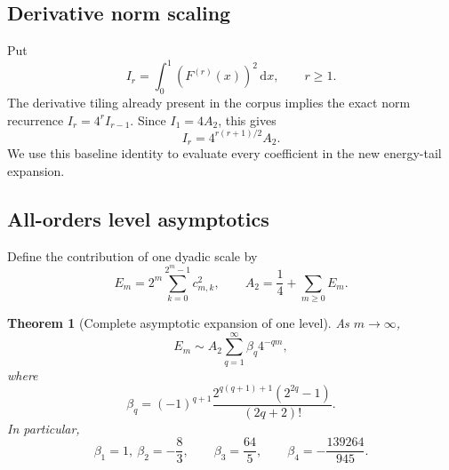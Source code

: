 \documentclass[11pt,oneside]{article}
\newtheorem{theorem}{Theorem}[section]
\theoremstyle{definition}
\theoremstyle{remark}
\newcommand{\dd}{\,\mathrm d}
\newcommand{\1}{\mathbf 1}
\begin{document}
\subsection{Derivative norm scaling}

Put
\begin{equation}
 I_r=\int_0^1\left(F^{(r)}(x)\right)^2\dd x,
 \qquad r\ge1.                                           \label{eq:Ir-definition}
\end{equation}
The derivative tiling already present in the corpus implies the exact norm
recurrence $I_r=4^rI_{r-1}$.  Since $I_1=4A_2$, this gives
\begin{equation}
 \boxed{\displaystyle
 I_r=4^{r(r+1)/2}A_2.}                                   \label{eq:derivative-norm-scaling}
\end{equation}
We use this baseline identity to evaluate every coefficient in the new
energy-tail expansion.

\subsection{All-orders level asymptotics}

Define the contribution of one dyadic scale by
\begin{equation}
 E_m=2^m\sum_{k=0}^{2^m-1}c_{m,k}^2,
 \qquad A_2=\frac14+\sum_{m\ge0}E_m.                     \label{eq:Em-definition}
\end{equation}

\begin{theorem}[Complete asymptotic expansion of one level]
\label{thm:Em-asymptotic}
As $m\to\infty$,
\begin{equation}
 \boxed{\displaystyle
 E_m\sim A_2\sum_{q=1}^\infty\beta_q4^{-qm},}            \label{eq:Em-asymptotic}
\end{equation}
where
\begin{equation}
 \boxed{\displaystyle
 \beta_q=(-1)^{q+1}
 \frac{2^{q(q+1)+1}(2^{2q}-1)}{(2q+2)!}.}                \label{eq:beta-formula}
\end{equation}
In particular,
\begin{equation}
 \beta_1=1,\
 \beta_2=-\frac83,
 \qquad
 \beta_3=\frac{64}{5},
 \qquad
 \beta_4=-\frac{139264}{945}.                           \label{eq:beta-first}
\end{equation}
\end{theorem}
\end{document}
